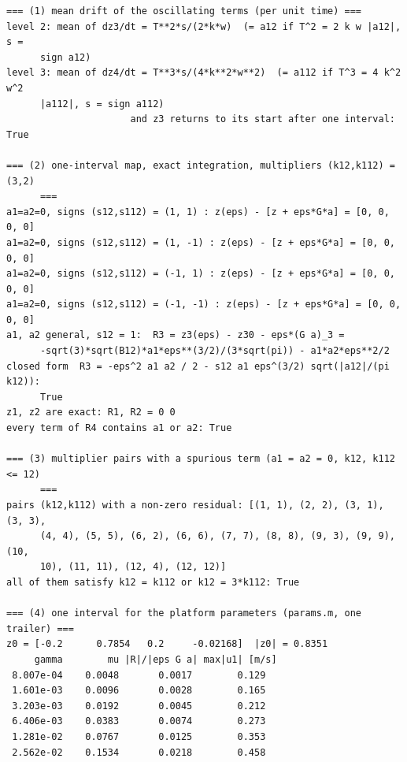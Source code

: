 {\footnotesize\begin{verbatim}
=== (1) mean drift of the oscillating terms (per unit time) ===
level 2: mean of dz3/dt = T**2*s/(2*k*w)  (= a12 if T^2 = 2 k w |a12|, s =
      sign a12)
level 3: mean of dz4/dt = T**3*s/(4*k**2*w**2)  (= a112 if T^3 = 4 k^2 w^2
      |a112|, s = sign a112)
                      and z3 returns to its start after one interval: True

=== (2) one-interval map, exact integration, multipliers (k12,k112) = (3,2)
      ===
a1=a2=0, signs (s12,s112) = (1, 1) : z(eps) - [z + eps*G*a] = [0, 0, 0, 0]
a1=a2=0, signs (s12,s112) = (1, -1) : z(eps) - [z + eps*G*a] = [0, 0, 0, 0]
a1=a2=0, signs (s12,s112) = (-1, 1) : z(eps) - [z + eps*G*a] = [0, 0, 0, 0]
a1=a2=0, signs (s12,s112) = (-1, -1) : z(eps) - [z + eps*G*a] = [0, 0, 0, 0]
a1, a2 general, s12 = 1:  R3 = z3(eps) - z30 - eps*(G a)_3 =
      -sqrt(3)*sqrt(B12)*a1*eps**(3/2)/(3*sqrt(pi)) - a1*a2*eps**2/2
closed form  R3 = -eps^2 a1 a2 / 2 - s12 a1 eps^(3/2) sqrt(|a12|/(pi k12)):
      True
z1, z2 are exact: R1, R2 = 0 0
every term of R4 contains a1 or a2: True

=== (3) multiplier pairs with a spurious term (a1 = a2 = 0, k12, k112 <= 12)
      ===
pairs (k12,k112) with a non-zero residual: [(1, 1), (2, 2), (3, 1), (3, 3),
      (4, 4), (5, 5), (6, 2), (6, 6), (7, 7), (8, 8), (9, 3), (9, 9), (10,
      10), (11, 11), (12, 4), (12, 12)]
all of them satisfy k12 = k112 or k12 = 3*k112: True

=== (4) one interval for the platform parameters (params.m, one trailer) ===
z0 = [-0.2      0.7854   0.2     -0.02168]  |z0| = 0.8351
     gamma        mu |R|/|eps G a| max|u1| [m/s]
 8.007e-04    0.0048       0.0017        0.129
 1.601e-03    0.0096       0.0028        0.165
 3.203e-03    0.0192       0.0045        0.212
 6.406e-03    0.0383       0.0074        0.273
 1.281e-02    0.0767       0.0125        0.353
 2.562e-02    0.1534       0.0218        0.458
\end{verbatim}}
